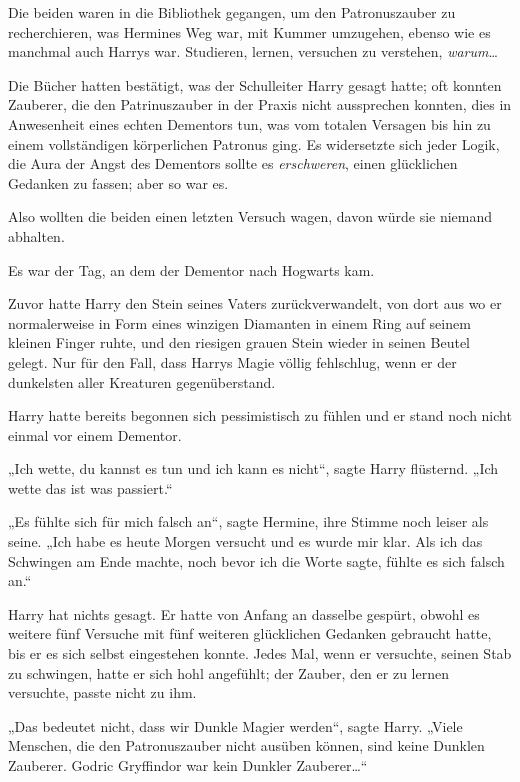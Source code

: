 {Die beiden waren in die Bibliothek gegangen, um den Patronuszauber zu recherchieren, was Hermines Weg war, mit Kummer umzugehen, ebenso wie es manchmal auch Harrys war. Studieren, lernen, versuchen zu verstehen, \emph{warum}…

Die Bücher hatten bestätigt, was der Schulleiter Harry gesagt hatte; oft konnten Zauberer, die den Patrinuszauber in der Praxis nicht aussprechen konnten, dies in Anwesenheit eines echten Dementors tun, was vom totalen Versagen bis hin zu einem vollständigen körperlichen Patronus ging. Es widersetzte sich jeder Logik, die Aura der Angst des Dementors sollte es \emph{erschweren}, einen glücklichen Gedanken zu fassen; aber so war es.

Also wollten die beiden einen letzten Versuch wagen, davon würde sie niemand abhalten.

Es war der Tag, an dem der Dementor nach Hogwarts kam.

Zuvor hatte Harry den Stein seines Vaters zurückverwandelt, von dort aus wo er normalerweise in Form eines winzigen Diamanten in einem Ring auf seinem kleinen Finger ruhte, und den riesigen grauen Stein wieder in seinen Beutel gelegt. Nur für den Fall, dass Harrys Magie völlig fehlschlug, wenn er der dunkelsten aller Kreaturen gegenüberstand.

Harry hatte bereits begonnen sich pessimistisch zu fühlen und er stand noch nicht einmal vor einem Dementor.

„Ich wette, du kannst es tun und ich kann es nicht“, sagte Harry flüsternd. „Ich wette das ist was passiert.“

„Es fühlte sich für mich falsch an“, sagte Hermine, ihre Stimme noch leiser als seine. „Ich habe es heute Morgen versucht und es wurde mir klar. Als ich das Schwingen am Ende machte, noch bevor ich die Worte sagte, fühlte es sich falsch an.“

Harry hat nichts gesagt. Er hatte von Anfang an dasselbe gespürt, obwohl es weitere fünf Versuche mit fünf weiteren glücklichen Gedanken gebraucht hatte, bis er es sich selbst eingestehen konnte. Jedes Mal, wenn er versuchte, seinen Stab zu schwingen, hatte er sich hohl angefühlt; der Zauber, den er zu lernen versuchte, passte nicht zu ihm.

„Das bedeutet nicht, dass wir Dunkle Magier werden“, sagte Harry. „Viele Menschen, die den Patronuszauber nicht ausüben können, sind keine Dunklen Zauberer. Godric Gryffindor war kein Dunkler Zauberer…“

}
